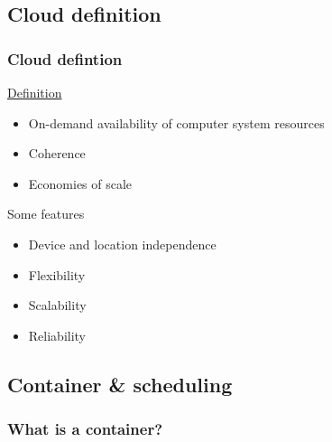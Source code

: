 \documentclass{beamer}
\begin{document}
	\subsection{Cloud definition}
	\begin{frame}
		\frametitle{Cloud defintion}
		
		\pause 
		
		\begin{block}{\href{https://en.wikipedia.org/wiki/Cloud_computing}{Definition}}
			\begin{itemize}
				\item On-demand availability of computer system resources
				\item Coherence
				\item Economies of scale
			\end{itemize}
		\end{block}

		\pause		
		
		\begin{block}{Some features}
			\begin{itemize}
				\item Device and location independence
				\item Flexibility
				\item Scalability
				\item Reliability
			\end{itemize}
		\end{block}
	\end{frame}		
	
	\subsection{Container \& scheduling}
	\begin{frame}
		\frametitle{What is a container?}
	\end{frame}
	
\end{document}
